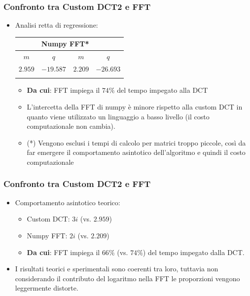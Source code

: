 \documentclass{beamer}
\begin{document}
\begin{frame}
	\frametitle{Confronto tra Custom DCT2 e FFT}
	\begin{itemize}
		\item Analisi retta di regressione:\\
		\begin{center}

			\begin{tabular}{cc|cc}
				\firsthline
				\multicolumn{2}{c}{\textbf{Custom DCT}} & \multicolumn{2}{c}{\textbf{Numpy FFT}*} \\	
				\hline
				\hline
				$m$    & $q$ & $m$ & $q$  \\
				\hline
				$2.959$ & $-19.587$ & $2.209$&  $-26.693$\\
				\lasthline
			\end{tabular}
	
		\end{center}

		\begin{itemize}
			\item \textbf{Da cui}: FFT impiega il $74\%$ del tempo impegato alla DCT
			\item L'intercetta della FFT di numpy è minore rispetto alla custom DCT in quanto viene utilizzato un linguaggio a basso livello (il costo computazionale non cambia).
		\item (*) Vengono esclusi i tempi di calcolo per matrici troppo piccole, così da far emergere il comportamento asintotico dell'algoritmo e quindi il costo computazionale
		\end{itemize}
	\end{itemize}
\end{frame}

\begin{frame}
	\frametitle{Confronto tra Custom DCT2 e FFT}
	\begin{itemize}
		\item Comportamento asintotico teorico:
		\begin{itemize}
			\item Custom DCT: $3i$ (vs. $2.959$)
			\item Numpy FFT: $2i$ (vs. $2.209$)
			\item \textbf{Da cui}: FFT impiega il $66\%$ (vs. $74\%$) del tempo impegato dalla DCT.
		\end{itemize}
		\item I risultati teorici e sperimentali sono coerenti tra loro, tuttavia non considerando il contributo del logaritmo nella FFT le proporzioni vengono leggermente distorte.
	\end{itemize}
\end{frame}
\end{document}

